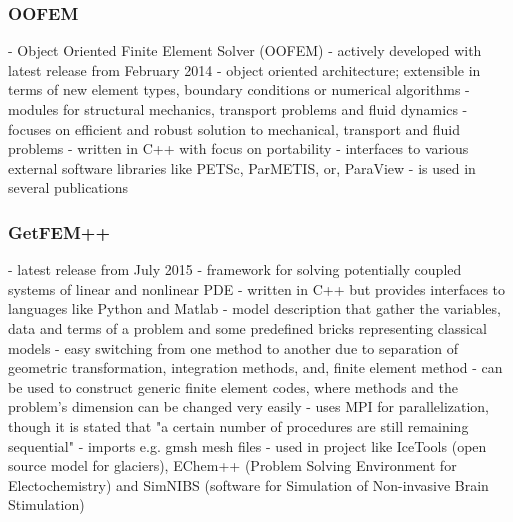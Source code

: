 \documentclass[11pt,twoside]{scrartcl}
\begin{document}
  \subsubsection{OOFEM}\cite{oofem}
  - Object Oriented Finite Element Solver (OOFEM) 
  - actively developed with latest release from February 2014\newline
  - object oriented architecture; extensible in terms of new element types, boundary conditions or numerical algorithms\newline
  - modules for structural mechanics, transport problems and fluid dynamics\newline
  - focuses on efficient and robust solution to mechanical, transport and fluid problems\newline
  - written in C++ with focus on portability\newline
  - interfaces to various external software libraries like PETSc, ParMETIS, or, ParaView\newline
  - is used in several publications \cite{oofemPubs}
  \subsubsection{GetFEM++}
  - latest release from July 2015
  - framework for solving potentially coupled systems of linear and nonlinear PDE\newline
  - written in C++ but provides interfaces to languages like Python and Matlab\newline
  - model description that gather the variables, data and terms of a problem and some predefined bricks representing classical models\newline
  - easy switching from one method to another due to separation of geometric transformation, integration methods, and, finite element method\newline
  - can be used to construct generic finite element codes, where methods and the problem's dimension can be changed very easily\newline
  - uses MPI for parallelization, though it is stated that "a certain number of procedures are still remaining sequential" \cite{getfemppMPI}
  - imports e.g. gmsh mesh files\newline
  - used in project like IceTools \cite{icetools} (open source model for glaciers), EChem++ \cite{echempp} (Problem Solving Environment for Electochemistry) and SimNIBS \cite{simnibs} (software for Simulation of Non-invasive Brain Stimulation)
\end{document}
